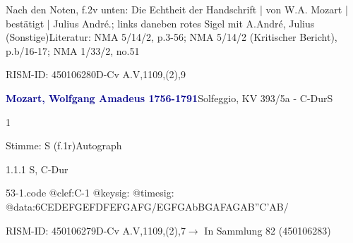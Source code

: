\documentclass[a4paper, twocolumn, 11pt]{book}
\begin{document}
\par Nach den Noten, f.2v unten: {\textquotedbl}Die Echtheit der Handschrift | von W.A. Mozart | bestätigt | Julius André.{\textquotedbl}; links daneben rotes Sigel mit {\textquotedbl}A{\textquotedbl}.\newline André, Julius  (Sonstige)\newline Literatur: NMA  5/14/2, p.3-56; NMA  5/14/2 (Kritischer Bericht), p.b/16-17; NMA  1/33/2, no.51
\par RISM-ID: 450106280\newline D-Cv  A.V,1109,(2),9
\par \vspace{16pt} \textcolor{darkblue}{\textbf{Mozart, Wolfgang Amadeus  1756-1791}}\hfillplus{[53]}\newline Solfeggio, KV 393/5a - C-Dur\newline S
\par \begin{itshape} 1\end{itshape} 
\par \textcolor{darkblue}{}  Stimme: S  (f.1r)\newline Autograph
\par 1.1.1  S, C-Dur  
\begin{filecontents*}{53-1.code}
@clef:C-1
@keysig:
@timesig:
@data:{6CEDE}{FGEF}{DFEF}{GAFG}/{EGFG}{AbBGA}{FAGA}{B''C'AB}/
\end{filecontents*}
\newline %
\par RISM-ID: 450106279\newline D-Cv  A.V,1109,(2),7\newline $\rightarrow$ In Sammlung 82 (450106283)
      
\end{document}
